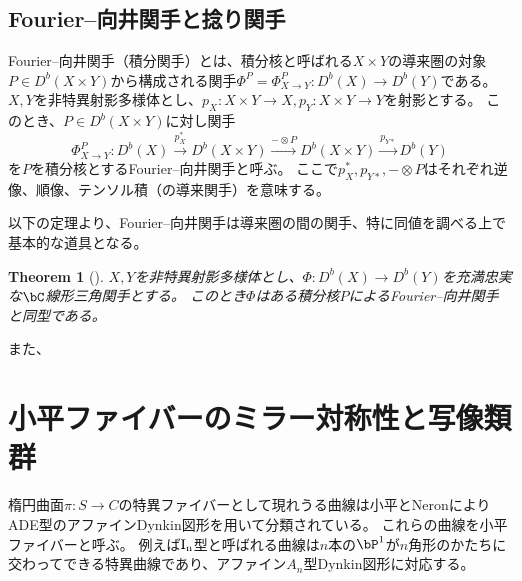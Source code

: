 \documentclass[uplatex,a4paper,dvipdfmx]{jsarticle}
\theoremstyle{plain}
\newtheorem{theorem}{Theorem}[section]
\theoremstyle{definition}
\begin{document}
\subsection{Fourier--向井関手と捻り関手}
Fourier--向井関手（積分関手）とは、積分核と呼ばれる$X \times Y$の導来圏の対象$P \in D^b(X \times Y)$から構成される関手$\Phi^P =\Phi^P_{X \to Y}\colon D^b(X) \to D^b(Y)$である。
$X, Y$を非特異射影多様体とし、$p_X \colon X\times Y \to X, p_Y \colon X \times Y \to Y$を射影とする。
このとき、$P \in D^b(X \times Y)$に対し関手
\begin{equation}
	\Phi^P_{X \to Y} \colon D^b(X) \xrightarrow{p_X^*} D^b(X \times Y) \xrightarrow{ - \otimes P} D^b(X \times Y) \xrightarrow{p_{Y*}} D^b(Y)
\end{equation}
を$P$を積分核とするFourier--向井関手と呼ぶ。
ここで$p_X^*, p_{Y*}, - \otimes P$はそれぞれ逆像、順像、テンソル積（の導来関手）を意味する。

以下の定理より、Fourier--向井関手は導来圏の間の関手、特に同値を調べる上で基本的な道具となる。
\begin{theorem}[\cite{MR1465519}]
	$X, Y$を非特異射影多様体とし、$\Phi \colon D^b(X) \to D^b(Y)$を充満忠実な$\bC$線形三角関手とする。
	このとき$\Phi$はある積分核$P$によるFourier--向井関手と同型である。
\end{theorem}

また、
\section{小平ファイバーのミラー対称性と写像類群}
楕円曲面$\pi \colon S \to C$の特異ファイバーとして現れうる曲線は小平とNeronによりADE型のアファインDynkin図形を用いて分類されている。
これらの曲線を小平ファイバーと呼ぶ。
例えば$\rm{I}_n$型と呼ばれる曲線は$n$本の$\bP^1$が$n$角形のかたちに交わってできる特異曲線であり、アファイン$A_n$型Dynkin図形に対応する。
\end{document}
